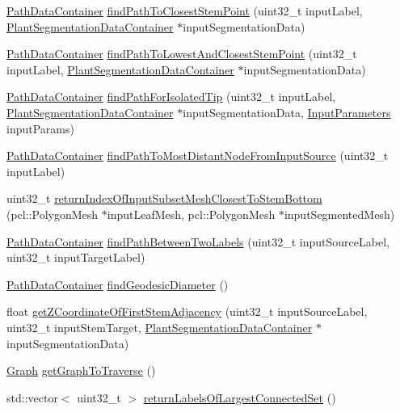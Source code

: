\begin{DoxyCompactItemize}
\item 
\hyperlink{classPathDataContainer}{Path\-Data\-Container} \hyperlink{classDijkstraPathfinder_a0b7ef55a95ad75edc86d4dcc4ea01fed}{find\-Path\-To\-Closest\-Stem\-Point} (uint32\-\_\-t input\-Label, \hyperlink{classPlantSegmentationDataContainer}{Plant\-Segmentation\-Data\-Container} $\ast$input\-Segmentation\-Data)
\item 
\hyperlink{classPathDataContainer}{Path\-Data\-Container} \hyperlink{classDijkstraPathfinder_a1a7fccaf7fd61e0a94e04d4b42b9e67c}{find\-Path\-To\-Lowest\-And\-Closest\-Stem\-Point} (uint32\-\_\-t input\-Label, \hyperlink{classPlantSegmentationDataContainer}{Plant\-Segmentation\-Data\-Container} $\ast$input\-Segmentation\-Data)
\item 
\hyperlink{classPathDataContainer}{Path\-Data\-Container} \hyperlink{classDijkstraPathfinder_a435466df93be2dfd714820f9749a6d48}{find\-Path\-For\-Isolated\-Tip} (uint32\-\_\-t input\-Label, \hyperlink{classPlantSegmentationDataContainer}{Plant\-Segmentation\-Data\-Container} $\ast$input\-Segmentation\-Data, \hyperlink{classInputParameters}{Input\-Parameters} input\-Params)
\item 
\hyperlink{classPathDataContainer}{Path\-Data\-Container} \hyperlink{classDijkstraPathfinder_a0911d1e140a05e751634298855c03c31}{find\-Path\-To\-Most\-Distant\-Node\-From\-Input\-Source} (uint32\-\_\-t input\-Label)
\item 
uint32\-\_\-t \hyperlink{classDijkstraPathfinder_a96521864f85917d6ef56eef84173abd3}{return\-Index\-Of\-Input\-Subset\-Mesh\-Closest\-To\-Stem\-Bottom} (pcl\-::\-Polygon\-Mesh $\ast$input\-Leaf\-Mesh, pcl\-::\-Polygon\-Mesh $\ast$input\-Segmented\-Mesh)
\item 
\hyperlink{classPathDataContainer}{Path\-Data\-Container} \hyperlink{classDijkstraPathfinder_a9607a23481b2913e9b67ff4c271a65dc}{find\-Path\-Between\-Two\-Labels} (uint32\-\_\-t input\-Source\-Label, uint32\-\_\-t input\-Target\-Label)
\item 
\hyperlink{classPathDataContainer}{Path\-Data\-Container} \hyperlink{classDijkstraPathfinder_aec108eda94566ce2b25fd0b3dd3b0c87}{find\-Geodesic\-Diameter} ()
\item 
float \hyperlink{classDijkstraPathfinder_a6b0047285a23902222718b16b97012b8}{get\-Z\-Coordinate\-Of\-First\-Stem\-Adjacency} (uint32\-\_\-t input\-Source\-Label, uint32\-\_\-t input\-Stem\-Target, \hyperlink{classPlantSegmentationDataContainer}{Plant\-Segmentation\-Data\-Container} $\ast$input\-Segmentation\-Data)
\item 
\hyperlink{classGraph}{Graph} \hyperlink{classDijkstraPathfinder_ab1b156fb3b6bd0e1f0cd0ee81f070881}{get\-Graph\-To\-Traverse} ()
\item 
std\-::vector$<$ uint32\-\_\-t $>$ \hyperlink{classDijkstraPathfinder_acd588e3cb888ade9e38005a9b7042462}{return\-Labels\-Of\-Largest\-Connected\-Set} ()
\end{DoxyCompactItemize}
